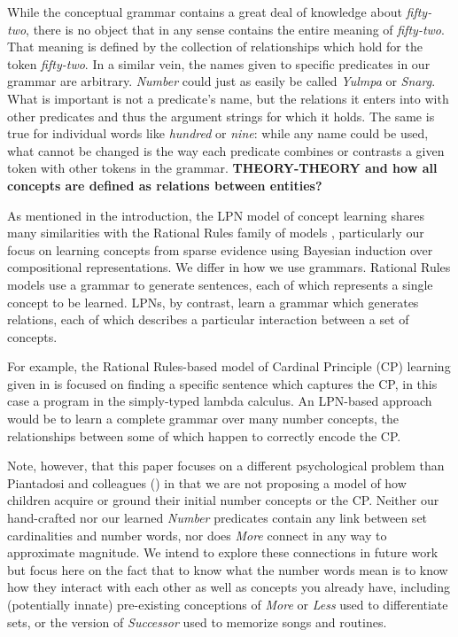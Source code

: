 \documentclass[10pt,letterpaper]{article}
\begin{document}

While the conceptual grammar contains a great deal of knowledge about
\emph{fifty-two}, there is no object that in any sense contains the
entire meaning of \emph{fifty-two}. That meaning is defined by the
collection of relationships which hold for the token \emph{fifty-two}.
In a similar vein, the names given to specific predicates in our
grammar are arbitrary. \emph{Number} could just as easily be called
\emph{Yulmpa} or \emph{Snarg}. What is important is not a predicate's
name, but the relations it enters into with other predicates and thus
the argument strings for which it holds. The same is true for
individual words like \emph{hundred} or \emph{nine}: while any name
could be used, what cannot be changed is the way each predicate
combines or contrasts a given token with other tokens in the grammar.
{\bf THEORY-THEORY and how all concepts are defined as relations
  between entities?}

As mentioned in the introduction, the LPN model of concept learning
shares many similarities with the Rational Rules family of models
\citep{goodman2008rational,T.D.Ullman:2012:1b1b6,PianGoodTen2012},
particularly our focus on learning concepts from sparse evidence using
Bayesian induction over compositional representations. We differ in
how we use grammars. Rational Rules models use a grammar to generate
sentences, each of which represents a single concept to be learned.
LPNs, by contrast, learn a grammar which generates relations, each of
which describes a particular interaction between a set of concepts.

For example, the Rational Rules-based model of Cardinal Principle (CP)
learning given in \citep{PianGoodTen2012} is focused on finding a
specific sentence which captures the CP, in this case a program in the
simply-typed lambda calculus. An LPN-based approach would be to learn
a complete grammar over many number concepts, the relationships
between some of which happen to correctly encode the CP.

Note, however, that this paper focuses on a different psychological
problem than Piantadosi and colleagues (\citeyear{PianGoodTen2012}) in
that we are not proposing a model of how children acquire or ground
their initial number concepts or the CP. Neither our hand-crafted nor
our learned \emph{Number} predicates contain any link between set
cardinalities and number words, nor does \emph{More} connect in any
way to approximate magnitude. We intend to explore these connections
in future work but focus here on the fact that to know what the number
words mean is to know how they interact with each other as well as
concepts you already have, including (potentially innate) pre-existing
conceptions of \emph{More} or \emph{Less} used to differentiate sets,
or the version of \emph{Successor} used to memorize songs and
routines.
\end{document}
